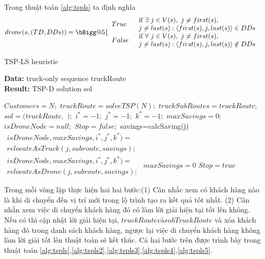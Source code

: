 \documentclass[a4paper,12pt]{report}
\makeatletter
\newcommand{\Vast}{\bBigg@{5}}
\makeatother
\begin{document}
Trong thuật toán  \ref{alg:tspls} ta định nghĩa 
$$
drone(s,(TD,DDs))= \Vast\{
\begin{array}{ll}
		True & \begin{array}{l}
		\text{if}	\	\exists \ j \in V(s),\ j \neq first(s), \\ j \neq last(s): \langle first(s),j,last(s) \rangle \in DDs
		\end{array}  \\
		False &  \begin{array}{l}
		\text{if}	\	\forall \ j \in V(s),\ j \neq first(s), \\ j \neq last(s): \langle first(s),j,last(s) \rangle \notin DDs
		\end{array}
\end{array}
$$
\begin{algorithm}[H]
\caption{TSP-LS heuristic}
\textbf{Data:} truck-only sequence truckRoute\\
\textbf{Result:} TSP-D solution sol
\begin{algorithmic}[1]
\State $Customers = N ;$
\State $truckRoute = solveTSP(N);$
\State $truckSubRoutes = {truckRoute};$
\State $sol = (truckRoute, $ $);$
\State $i^*=-1;$
\State $j^*=-1;$
\State $k^*=-1;$
\State $maxSavings = 0;$
\State $isDroneNode = null;$
\State $Stop = f alse;$
\Repeat
{}
\State savings=calcSaving(j)
\State $\begin{array}{l}
	isDroneNode,maxSavings,i^*,j^*,k^*)=\\
	relocateAsTruck(j,subroute,savings);
\end{array}$ 
\Else
\State $\begin{array}{l}
isDroneNode,maxSavings,i^*,j^*,k^*)= \\ relocateAsDrone(j,subroute,savings);
\end{array}$
\EndIf
\EndFor
{} 
\State $maxSavings=0$
\Else 
\State $Stop=true$
\EndIf
\EndFor
{}
\end{algorithmic}
\label{alg:tspls}
\end{algorithm}
Trong mỗi vòng lặp thực hiện hai hai bước:(1) Cân nhắc xem có khách hàng nào là khi di chuyển đến vị trí mới trong lộ trình tạo ra kết quả tốt nhất. (2) Cân nhắn xem việc di chuyển khách hàng đó có làm lời giải hiện tại tốt lên không. Nếu có thì cập nhật lời giải hiện tại, $truckRoute và subTruckRoute$ và xóa khách hàng đó trong danh sách khách hàng, ngược lại việc di chuyển khách hàng không làm lời giải tốt lên thuật toán sẽ kết thúc. Cả hai bước trên được trình bày trong thuật toán \ref{alg:tspls},\ref{alg:tspls2},\ref{alg:tspls3},\ref{alg:tspls4},\ref{alg:tspls5}.
\end{document}
